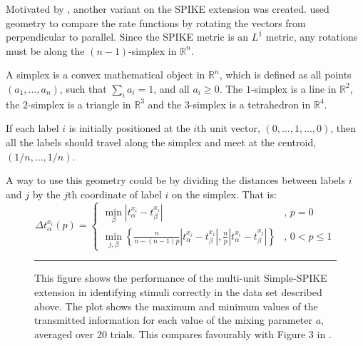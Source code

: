 Motivated by \citep{HoughtonSen2008a}, another variant on the SPIKE extension was created.  \citet{HoughtonSen2008a} used geometry to compare the rate functions by rotating the vectors from perpendicular to parallel.  Since the SPIKE metric is an $L^1$ metric, any rotations must be along the $(n-1)$-simplex in $\mathbb{R}^n$.


A simplex is a convex mathematical object in $\mathbb{R}^n$, which is defined as all points $(a_1,\dots,a_n)$, such that $\sum_i a_i = 1$, and all $a_i\geq0$.  The $1$-simplex is a line in $\mathbb{R}^2$, the $2$-simplex is a triangle in $\mathbb{R}^3$ and the $3$-simplex is a tetrahedron in $\mathbb{R}^4$.


If each label $i$ is initially positioned at the $i$th unit vector, $(0,\ldots,1,\dots,0)$, then all the labels should travel along the simplex and meet at the centroid, $(1/n,\ldots,1/n)$.


A way to use this geometry could be by dividing the distances between labels $i$ and $j$ by the $j$th coordinate of label $i$ on the simplex.  That is:
\begin{equation}\label{multspike}
\Delta t_{\alpha}^{x_i}(p) = \left\{ \begin{array}{ll} \min_{\beta} | t_{\alpha}^{x_i} - t_{\beta}^{x_i} | & , \, p=0 \\
\min_{j,\beta}\left\{ \frac{n}{n-(n-1)p} | t_{\alpha}^{x_i} - t_{\beta}^{x_i} |,\frac{n}{p} | t_{\alpha}^{x_i} - t_{\beta}^{x_j} |\right\} & , \, 0<p\leq1 \end{array}\right.
\end{equation}


\begin{figure}[bht]
\begin{center}
\resizebox{0.75\textwidth}{!}{}
\end{center}
\rule{31.5em}{0.5pt}
\caption{\label{haadds}This figure shows the performance of the multi-unit Simple-SPIKE extension in identifying stimuli correctly in the data set described above.  The plot shows the maximum and minimum values of the transmitted information for each value of the mixing parameter $a$, averaged over 20 trials. This compares favourably with Figure 3 in \citep{HoughtonSen2008a}.}
\end{figure}

